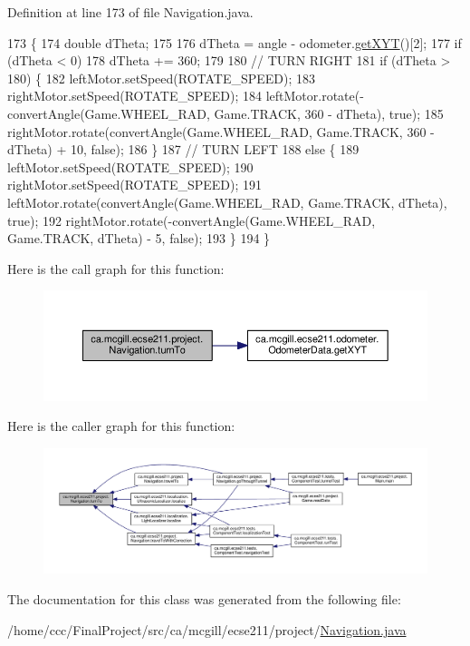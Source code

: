 Definition at line 173 of file Navigation.\+java.


\begin{DoxyCode}
173                                                 \{
174     \textcolor{keywordtype}{double} dTheta;
175 
176     dTheta = angle - odometer.\hyperlink{classca_1_1mcgill_1_1ecse211_1_1odometer_1_1_odometer_data_a8f40f0264c68f0cbed4fff1723ae7863}{getXYT}()[2];
177     \textcolor{keywordflow}{if} (dTheta < 0)
178       dTheta += 360;
179 
180     \textcolor{comment}{// TURN RIGHT}
181     \textcolor{keywordflow}{if} (dTheta > 180) \{
182       leftMotor.setSpeed(ROTATE\_SPEED);
183       rightMotor.setSpeed(ROTATE\_SPEED);
184       leftMotor.rotate(-convertAngle(Game.WHEEL\_RAD, Game.TRACK, 360 - dTheta), \textcolor{keyword}{true});
185       rightMotor.rotate(convertAngle(Game.WHEEL\_RAD, Game.TRACK, 360 - dTheta) + 10, \textcolor{keyword}{false});
186     \}
187     \textcolor{comment}{// TURN LEFT}
188     \textcolor{keywordflow}{else} \{
189       leftMotor.setSpeed(ROTATE\_SPEED);
190       rightMotor.setSpeed(ROTATE\_SPEED);
191       leftMotor.rotate(convertAngle(Game.WHEEL\_RAD, Game.TRACK, dTheta), \textcolor{keyword}{true});
192       rightMotor.rotate(-convertAngle(Game.WHEEL\_RAD, Game.TRACK, dTheta) - 5, \textcolor{keyword}{false});
193     \}
194   \}
\end{DoxyCode}
Here is the call graph for this function\+:
\nopagebreak
\begin{figure}[H]
\begin{center}
\leavevmode
\includegraphics[width=350pt]{classca_1_1mcgill_1_1ecse211_1_1project_1_1_navigation_a3bbe0645f2b3b3d0986b4a707fb5a00c_cgraph}
\end{center}
\end{figure}
Here is the caller graph for this function\+:
\nopagebreak
\begin{figure}[H]
\begin{center}
\leavevmode
\includegraphics[width=350pt]{classca_1_1mcgill_1_1ecse211_1_1project_1_1_navigation_a3bbe0645f2b3b3d0986b4a707fb5a00c_icgraph}
\end{center}
\end{figure}


The documentation for this class was generated from the following file\+:\begin{DoxyCompactItemize}
\item 
/home/ccc/\+Final\+Project/src/ca/mcgill/ecse211/project/\hyperlink{_navigation_8java}{Navigation.\+java}\end{DoxyCompactItemize}
